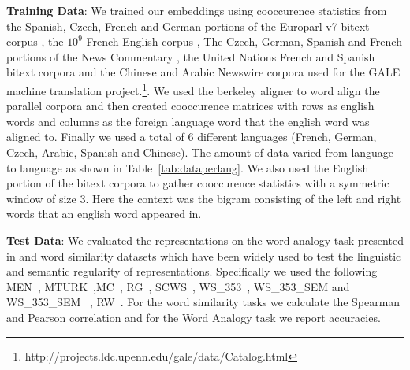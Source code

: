 \documentclass[11pt]{article}
\begin{document}
\textbf{Training Data}: We trained our embeddings using cooccurence
statistics from the Spanish, Czech, French and German portions of the
Europarl v7 bitext corpus \cite{koehn2005europarl}, the $10^9$
French-English corpus \cite{callisonburch2009findings}, The Czech,
German, Spanish and French portions of the News Commentary
\cite{koehn2007experiments}, the United Nations French and Spanish
bitext corpora \cite{eisele2010multiun} and the Chinese and Arabic
Newswire corpora used for the GALE machine translation
project.\footnote{{http://projects.ldc.upenn.edu/gale/data/Catalog.html}}. We
used the berkeley aligner to word align the parallel corpora and then
created cooccurence matrices with rows as english words and columns as
the foreign language word that the english word was aligned
to. Finally we used a total of 6 different languages (French, German,
Czech, Arabic, Spanish and Chinese). The amount of data varied from
language to language as shown in Table~\ref{tab:dataperlang}. We also
used the English portion of the bitext corpora to gather cooccurence
statistics with a symmetric window of size 3. Here the context was the
bigram consisting of the left and right words that an english word
appeared in.  

\textbf{Test Data}: We evaluated the representations on the word
analogy task presented in \cite{mikolov2013distributed} and word similarity
datasets which have been widely used to test the linguistic
and semantic regularity of representations. Specifically we used the following
MEN~\cite{bruni2012distributional},
MTURK~\cite{Radinsky2011word},MC~\cite{miller1991contextual},
RG~\cite{Rubenstein1965Contextual}, SCWS~\cite{Huang2012Improving},
WS\_353~\cite{finkelstein2001placing}, WS\_353\_SEM and WS\_353\_SEM
~\cite{aggire2009study}, RW~\cite{Luong2013morpho}. For the word
similarity tasks we calculate the Spearman and
Pearson correlation and for the Word Analogy task we report
accuracies. 
\end{document}
